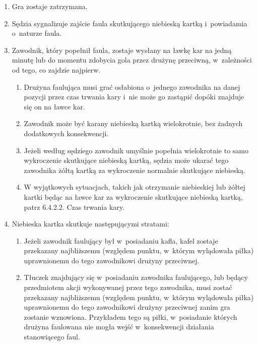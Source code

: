\documentclass[12pt]{article}
\begin{document}
\begin{enumerate}
	\item
	      Gra zostaje zatrzymana.
	\item
	      Sędzia sygnalizuje zajście faula skutkującego niebieską kartką i~powiadamia o~naturze faula.
	\item
	      Zawodnik, który popełnił faula, zostaje wysłany na ławkę kar na jedną
	      minutę lub do momentu zdobycia gola przez drużynę przeciwną, w~zależności od tego, co zajdzie najpierw.

	      \begin{enumerate}
		      \item
		            Drużyna faulująca musi grać osłabiona o~jednego zawodnika na danej
		            pozycji przez czas trwania kary i~nie może go zastąpić dopóki
		            znajduje się on na ławce kar.
		      \item
		            Zawodnik może być karany niebieską kartką wielokrotnie, bez żadnych
		            dodatkowych konsekwencji.
		      \item
		            Jeżeli według sędziego zawodnik umyślnie popełnia wielokrotnie to
		            samo wykroczenie skutkujące niebieską kartką, sędzia może ukarać
		            tego zawodnika żółtą kartką za wykroczenie normalnie skutkujące
		            niebieską.
		      \item
		            W wyjątkowych sytuacjach, takich jak otrzymanie niebieskiej lub
		            żółtej kartki będąc na ławce kar za wykroczenie skutkujące niebieską
		            kartką, patrz 6.4.2.2. Czas trwania kary.
	      \end{enumerate}
	\item
	      Niebieska kartka skutkuje następującymi stratami:

	      \begin{enumerate}
		      \item
		            Jeżeli zawodnik faulujący był w~posiadaniu kafla, kafel zostaje
		            przekazany najbliższemu (względem punktu, w~którym wylądowała piłka)
		            uprawnionemu do tego zawodnikowi drużyny przeciwnej.
		      \item
		            Tłuczek znajdujący się w~posiadaniu zawodnika faulującego, lub
		            będący przedmiotem akcji wykonywanej przez tego zawodnika, musi
		            zostać przekazany najbliższemu (względem punktu, w~którym wylądowała
		            piłka) uprawnionemu do tego zawodnikowi drużyny przeciwnej zanim gra
		            zostanie wznowiona. Przykładem tego są piłki, w~posiadanie których
		            drużyna faulowana nie mogła wejść w~konsekwencji działania
		            stanowiącego faul.


\end{enumerate}
\end{enumerate}
\end{document}

